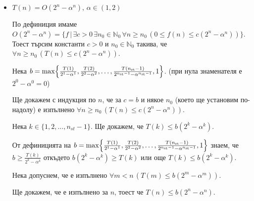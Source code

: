 \begin{solution}
\begin{itemize}
		\vspace{0.35cm}
		\item $T(n)=O(2^n-\alpha^n),\,\alpha\in(1,2)$
		
		По $\hyperref[bdef-asymp-classes]{\text{дефиниция}}$ имаме $O(2^n-\alpha^n)=\{f\,|\,\exists c>0\,\exists n_0\in\mathbb{N}_0\,\forall n\ge n_0\,(0\le f(n)\le c(2^n-\alpha^n))\}$. Тоест търсим константи $c>0$ и $n_0\in\mathbb{N}_0$ такива, че $\forall n\ge n_0\,(T(n)\le c(2^n-\alpha^n))$.
		
		Нека $b=\max\Bigl\{\frac{T(1)}{2^1-\alpha^1},\frac{T(2)}{2^2-\alpha^2},\dots,\frac{T(n_{\text{st}}-1)}{2^{n_{\text{st}}-1}-\alpha^{n_{\text{st}}-1}},1\Bigr\}$. (при нула знаменателя е $2^0-\alpha^0=0$)
		
		Ще докажем с индукция по $n$, че за $c=b$ и някое $n_0$ (което ще установим по-надолу) е изпълнено $\forall n\ge n_0\,(T(n)\le c(2^n-\alpha^n))$.
		
		\begin{base}
			Нека $k\in\{1,2,\dots,n_{st}-1\}$. Ще докажем, че $T(k)\le b(2^k-\alpha^k)$.
			
			От дефиницията на $b=\max\Bigl\{\frac{T(1)}{2^1-\alpha^1},\frac{T(2)}{2^2-\alpha^2},\dots,\frac{T(n_{\text{st}}-1)}{2^{n_{\text{st}}-1}-\alpha^{n_{\text{st}}-1}},1\Bigr\}$ знаем, че $b\ge \frac{T(k)}{2^k-\alpha^k}$ откъдето $b(2^k-\alpha^k)\ge T(k)$ или още $T(k)\le b(2^k-\alpha^k)$.
		\end{base}
		
		\begin{indhypothesis}
			Нека допуснем, че е изпълнено $\forall m<n\,(T(m)\le b(2^m-\alpha^m))$.
		\end{indhypothesis}
	
		\begin{indstep}
			Ще докажем, че е изпълнено за $n$, тоест че $T(n)\le b(2^n-\alpha^n)$.
			

\end{indstep}
\end{itemize}
\end{solution}
